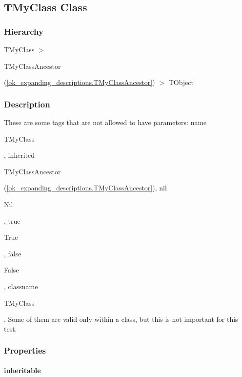 \documentclass{report}
\begin{document}
\subsection*{TMyClass Class}
\subsubsection*{\large{\textbf{Hierarchy}}\normalsize\hspace{1ex}\hfill}
TMyClass {$>$} \begin{ttfamily}TMyClassAncestor\end{ttfamily}(\ref{ok_expanding_descriptions.TMyClassAncestor}) {$>$} 
TObject
\subsubsection*{\large{\textbf{Description}}\normalsize\hspace{1ex}\hfill}
These are some tags that are not allowed to have parameters: name \begin{ttfamily}TMyClass\end{ttfamily}, inherited \begin{ttfamily}TMyClassAncestor\end{ttfamily}(\ref{ok_expanding_descriptions.TMyClassAncestor}), nil \begin{ttfamily}Nil\end{ttfamily}, true \begin{ttfamily}True\end{ttfamily}, false \begin{ttfamily}False\end{ttfamily}, classname \begin{ttfamily}TMyClass\end{ttfamily}. Some of them are valid only within a class, but this is not important for this test.

\subsubsection*{\large{\textbf{Properties}}\normalsize\hspace{1ex}\hfill}
\paragraph*{inheritable}\hspace*{\fill}
\end{document}
